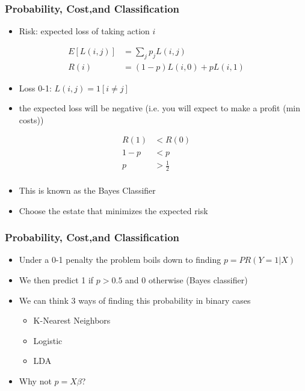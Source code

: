 \documentclass[
  shownotes,
  xcolor={svgnames},
  hyperref={colorlinks,citecolor=DarkBlue,linkcolor=DarkRed,urlcolor=DarkBlue}
  , aspectratio=169]{beamer}
\begin{document}
\begin{frame}[fragile]
\frametitle{Probability, Cost,and Classification}

\begin{itemize}
  \item Risk: expected loss of taking action $i$
\end{itemize}

\begin{align}
E[L(i,j)] &= \sum_j p_j L(i,j) \\ \nonumber
R(i) &= (1-p) L(i,0) + p L(i,1)
\end{align}

\begin{itemize}
  \item Loss 0-1: $L(i,j)=1[i\neq j]$
  \item the expected loss will be negative (i.e. you will expect to make a profit (min costs)) 
\end{itemize}

\begin{align}
R(1) &< R(0) \\ \nonumber
1-p &< p \\ \nonumber
p &> \frac{1}{2} \\ \nonumber
\end{align}

\begin{itemize}
  \item This is known as the Bayes Classifier
  \item Choose the estate that minimizes the expected risk
\end{itemize}

\end{frame}
\begin{frame}[fragile]
\frametitle{Probability, Cost,and Classification}

\begin{itemize}
  \item Under a 0-1 penalty the problem boils down to finding $p=PR(Y=1|X)$
  \medskip
  \item We then predict 1 if $p>0.5$ and 0 otherwise (Bayes classifier)
  \medskip
  \item We can think 3 ways of finding this probability in binary cases
  \begin{itemize}
    \item K-Nearest Neighbors
    \item Logistic
    \item LDA
  \end{itemize}
\medskip
  \item Why not $p=X\beta$?
\end{itemize}


\end{frame}
\end{document}
